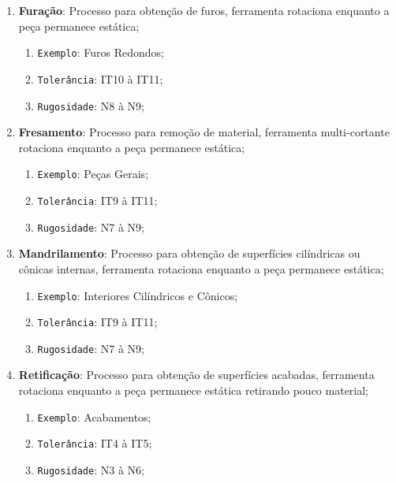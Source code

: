 \documentclass{article}
\begin{document}
\begin{enumerate}[rightmargin = \leftmargin]
                    \item \textbf{Furação}: Processo para obtenção de furos, ferramenta rotaciona enquanto a peça permanece estática;
                        \begin{enumerate}[rightmargin = \leftmargin, noitemsep]
                            \item \texttt{Exemplo}: Furos Redondos;
                            \item \texttt{Tolerância}: IT10 à IT11;
                            \item \texttt{Rugosidade}: N8 à N9;
                        \end{enumerate}

                    \item \textbf{Fresamento}: Processo para remoção de material, ferramenta multi-cortante rotaciona enquanto a peça permanece estática;
                        \begin{enumerate}[rightmargin = \leftmargin, noitemsep]
                            \item \texttt{Exemplo}: Peças Gerais;
                            \item \texttt{Tolerância}: IT9 à IT11;
                            \item \texttt{Rugosidade}: N7 à N9;
                        \end{enumerate}

                    \item \textbf{Mandrilamento}: Processo para obtenção de superfícies cilíndricas ou cônicas internas, ferramenta rotaciona enquanto a peça permanece estática;
                    \begin{enumerate}[rightmargin = \leftmargin, noitemsep]
                        \item \texttt{Exemplo}: Interiores Cilíndricos e Cônicos;
                        \item \texttt{Tolerância}: IT9 à IT11;
                        \item \texttt{Rugosidade}: N7 à N9;
                    \end{enumerate}

                    \item \textbf{Retificação}: Processo para obtenção de superfícies acabadas, ferramenta rotaciona enquanto a peça permanece estática retirando pouco material;
                        \begin{enumerate}[rightmargin = \leftmargin, noitemsep]
                            \item \texttt{Exemplo}: Acabamentos;
                            \item \texttt{Tolerância}: IT4 à IT5;
                            \item \texttt{Rugosidade}: N3 à N6;
                        \end{enumerate}


\end{enumerate}
\end{document}
